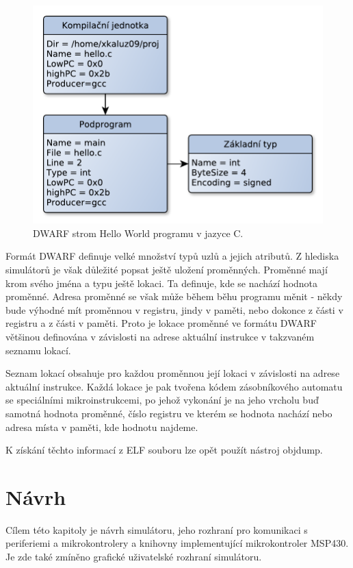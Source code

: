 \begin{figure}[ht]
\centering
\includegraphics[trim=0cm 0cm 0cm 0cm, scale=0.7]{fig/dwarf}
\caption{DWARF strom Hello World programu v jazyce C.}
\label{fig:dwarf}
\end{figure}

Formát DWARF definuje velké množství typů uzlů a jejich atributů. Z hlediska simulátorů je však důležité popsat ještě uložení proměnných. Proměnné mají krom svého jména a typu ještě lokaci. Ta definuje, kde se nachází hodnota proměnné. Adresa proměnné se však může během běhu programu měnit - někdy bude výhodné mít proměnnou v registru, jindy v paměti, nebo dokonce z části v registru a z části v paměti. Proto je lokace proměnné ve formátu DWARF většinou definována v závislosti na adrese aktuální instrukce v takzvaném seznamu lokací.

Seznam lokací obsahuje pro každou proměnnou její lokaci v závislosti na adrese aktuální instrukce. Každá lokace je pak tvořena kódem zásobníkového automatu se speciálními mikroinstrukcemi, po jehož vykonání je na jeho vrcholu buď samotná hodnota proměnné, číslo registru ve kterém se hodnota nachází nebo
adresa místa v paměti, kde hodnotu najdeme.

K získání těchto informací z ELF souboru lze opět použít nástroj objdump.


\chapter{Návrh}
\label{navrh}

Cílem této kapitoly je návrh simulátoru, jeho rozhraní pro komunikaci s periferiemi a mikrokontrolery a knihovny implementující mikrokontroler MSP430.
Je zde také zmíněno grafické uživatelské rozhraní simulátoru.

